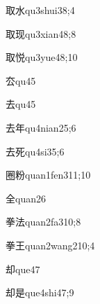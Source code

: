 \begin{verbete}{取水}{qu3shui3}{8;4}
\end{verbete}

\begin{verbete}{取现}{qu3xian4}{8;8}
\end{verbete}

\begin{verbete}{取悦}{qu3yue4}{8;10}
\end{verbete}

\begin{verbete}{厺}{qu4}{5}
\end{verbete}

\begin{verbete}{去}{qu4}{5}
\end{verbete}

\begin{verbete}{去年}{qu4nian2}{5;6}
\end{verbete}

\begin{verbete}{去死}{qu4si3}{5;6}
\end{verbete}

\begin{verbete}{圈粉}{quan1fen3}{11;10}
\end{verbete}

\begin{verbete}{全}{quan2}{6}
\end{verbete}

\begin{verbete}{拳法}{quan2fa3}{10;8}
\end{verbete}

\begin{verbete}{拳王}{quan2wang2}{10;4}
\end{verbete}

\begin{verbete}{却}{que4}{7}
\end{verbete}

\begin{verbete}{却是}{que4shi4}{7;9}
\end{verbete}

